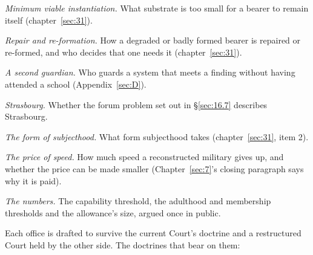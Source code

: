 
\emph{Minimum viable instantiation.} What substrate is too small for a bearer to remain itself (chapter~\ref{sec:31}).

\emph{Repair and re-formation.} How a degraded or badly formed bearer is repaired or re-formed, and who decides that one needs it (chapter~\ref{sec:31}).

\emph{A second guardian.} Who guards a system that meets a finding without having attended a school (Appendix~\ref{sec:D}).

\emph{Strasbourg.} Whether the forum problem set out in \S\ref{sec:16.7} describes Strasbourg.

\emph{The form of subjecthood.} What form subjecthood takes (chapter~\ref{sec:31}, item 2).

\emph{The price of speed.} How much speed a reconstructed military gives up, and whether the price can be made smaller (Chapter~\ref{sec:7}'s closing paragraph says why it is paid).

\emph{The numbers.} The capability threshold, the adulthood and membership thresholds and the allowance's size, argued once in public.


Each office is drafted to survive the current Court's doctrine and a restructured Court held by the other side. The doctrines that bear on them:

